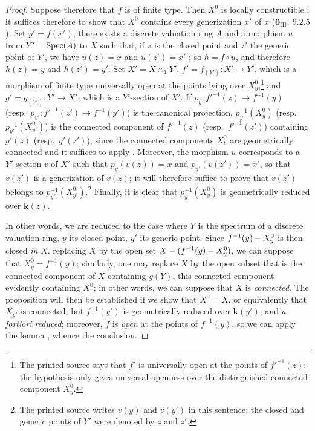 \begin{proof}
Suppose therefore that $f$ is of finite type.
Then $X^0$ is locally constructible ; it suffices therefore to show that $X^0$ contains every generization $x'$ of $x$ ($\mathbf{0}_{\mathrm{III}},~9.2.5$).
Set $y'=f(x')$; there exists a discrete valuation ring $A$ and a morphism $u$ from $Y'=\operatorname{Spec}(A)$ to $X$ such that, if $z$ is the closed point and $z'$ the generic point of $Y'$, we have $u(z)=x$ and $u(z')=x'$ ; so $h=f\circ u$, and therefore $h(z)=y$ and $h(z')=y'$.
Set $X'=X\times_Y Y'$, $f'=f_{(Y')}:X'\to Y'$, which is a morphism of finite type universally open at the points lying over $X_y^0$,\footnote{The printed source says that $f'$ is universally open at the points of $f'^{-1}(z)$; the hypothesis only gives universal openness over the distinguished connected component $X_y^0$.} and $g'=g_{(Y')}:Y'\to X'$, which is a $Y'$-section of $X'$.
If $p_y:f'^{-1}(z)\to f^{-1}(y)$ (resp.\ $p_{y'}:f'^{-1}(z')\to f^{-1}(y')$) is the canonical projection, $p_y^{-1}(X_y^0)$ (resp.\ $p_{y'}^{-1}(X_{y'}^0)$) is the connected component of $f'^{-1}(z)$ (resp.\ $f'^{-1}(z')$) containing $g'(z)$ (resp.\ $g'(z')$), since the connected components $X_t^0$ are geometrically connected  and it suffices to apply .
Moreover, the morphism $u$ corresponds to a $Y'$-section $v$ of $X'$ such that $p_y(v(z))=x$ and $p_{y'}(v(z'))=x'$, so that $v(z')$ is a generization of $v(z)$; it will therefore suffice to prove that $v(z')$ belongs to $p_{y'}^{-1}(X_{y'}^0)$.\footnote{The printed source writes $v(y)$ and $v(y')$ in this sentence; the closed and generic points of $Y'$ were denoted by $z$ and $z'$.}
Finally, it is clear that $p_y^{-1}(X_y^0)$ is geometrically reduced over $\boldsymbol{k}(z)$.

In other words, we are reduced to the case where $Y$ is the spectrum of a discrete valuation ring, $y$ its closed point, $y'$ its generic point.
Since $f^{-1}(y)- X_y^0$ is then closed \emph{in} $X$, replacing $X$ by the open set $X-(f^{-1}(y)- X_y^0)$, we can suppose that $X_y^0=f^{-1}(y)$; similarly, one may replace $X$ by the open subset that is the connected component of $X$ containing $g(Y)$, this connected component evidently containing $X^0$; in other words, we can suppose that $X$ is \emph{connected}.
The proposition will then be established if we show that $X^0=X$, or equivalently that $X_{y'}$ is connected; but $f^{-1}(y')$ is geometrically reduced over $\boldsymbol{k}(y')$, and \emph{a fortiori} \emph{reduced}; moreover, $f$ is \emph{open} at the points of $f^{-1}(y)$, so we can apply the lemma , whence the conclusion.
\end{proof}

